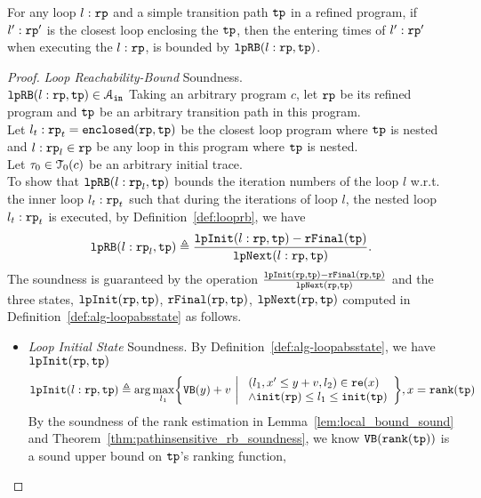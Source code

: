 \begin{lemma}
    For any loop $l: \mathtt{rp}$ and a simple transition path $\mathtt{tp}$ in a refined program, if $l':\mathtt{rp}'$ is the closest loop enclosing the $\mathtt{tp}$, then the entering times of $l':\mathtt{rp}'$ when executing the $l: \mathtt{rp}$, is bounded by $\mathtt{lpRB}(l: \mathtt{rp}, \mathtt{tp})$.
  \end{lemma}
  \begin{proof}
    \emph{Loop Reachability-Bound} Soundness.
    \\
$\mathtt{lpRB}(l: \mathtt{rp}, \mathtt{tp}) \in \mathcal{A}_{\mathtt{in}}$ 
Taking an arbitrary program $c$, let $\mathtt{rp}$ be its refined program and $\mathtt{tp}$ be an arbitrary transition path in this program.
\\
Let $l_t: \mathtt{rp}_t = \mathtt{enclosed}(\mathtt{rp}, \mathtt{tp})$ be the closest loop program where $\mathtt{tp}$ is nested
and $l: \mathtt{rp}_l \in \mathtt{rp}$ be any loop in this program where $\mathtt{tp}$ is nested.
\\
Let $\mathtt{\tau}_0 \in \mathcal{T}_0(c)$ be an arbitrary initial trace.
\\
To show that $\mathtt{lpRB}(l: \mathtt{rp}_l, \mathtt{tp})$ bounds the iteration numbers of the loop $l$ w.r.t.
the inner loop $l_t: \mathtt{rp}_t$ 
such that during the iterations of loop $l$, the nested loop $l_t: \mathtt{rp}_t$ is executed,
by Definition~\ref{def:looprb}, we have
\[
    \mathtt{lpRB}(l: \mathtt{rp}_l, \mathtt{tp}) \triangleq
    \frac{\mathtt{lpInit}(l: \mathtt{rp}, \mathtt{tp}) - \mathtt{rFinal}(\mathtt{tp})}{\mathtt{lpNext}(l: \mathtt{rp}, \mathtt{tp})}.
\]
The soundness is guaranteed by the operation
 $\frac{\mathtt{lpInit}(\mathtt{rp}, \mathtt{tp}) - \mathtt{rFinal}(\mathtt{rp}, \mathtt{tp})}{\mathtt{lpNext}(\mathtt{rp}, \mathtt{tp})}$ and the three states,
 $\mathtt{lpInit}(\mathtt{rp}, \mathtt{tp})$, $\mathtt{rFinal}(\mathtt{rp}, \mathtt{tp})$, $\mathtt{lpNext}(\mathtt{rp}, \mathtt{tp})$ computed in Definition~\ref{def:alg-loopabsstate}
 as follows.
\begin{itemize}
  \item \emph{Loop Initial State} Soundness.
    By Definition~\ref{def:alg-loopabsstate}, we have $\mathtt{lpInit}(\mathtt{rp}, \mathtt{tp})$ 
    \[
      \lpinit(l: \rprog, \tpath) \triangleq 
      \arg\max_{l_1}\left\{
          \varinvar(y) + v ~\middle\vert~ 
          \begin{array}{l} 
            (l_1, x' \leq y + v, l_2) \in \reset(x) 
            \\
            \land \absinit(\rprog) \leq l_1 \leq \absinit(\tpath)
          \end{array}
        \right\}, x = \locbound(\tpath)
      \]
  By the soundness of the rank estimation in Lemma~\ref{lem:local_bound_sound} and Theorem~\ref{thm:pathinsensitive_rb_soundness}, we know ${\mathtt{VB}}(\mathtt{rank}(\mathtt{tp}))$ is a sound upper bound on $\mathtt{tp}$'s ranking function,

\end{itemize}
\end{proof}
